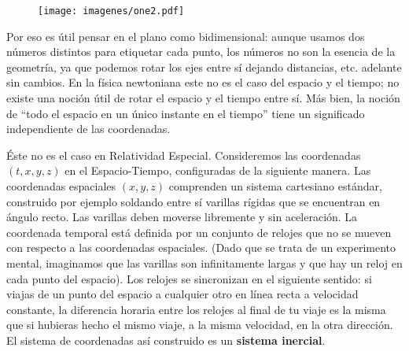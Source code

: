 \documentclass[11pt,b5paper,openany,twoside]{book}
\begin{document}
\begin{figure}[h]
\centering
\texttt{[image: imagenes/one2.pdf]}
\end{figure}

Por eso es útil pensar en el plano como bidimensional: aunque usamos dos números distintos para etiquetar cada punto, los números no son la esencia de la geometría, ya que podemos rotar los ejes entre sí dejando distancias, etc. adelante sin cambios.
En la física newtoniana este no es el caso del espacio y el tiempo; no existe una noción útil de rotar el espacio y el tiempo entre sí.
Más bien, la noción de ``todo el espacio en un único instante en el tiempo'' tiene un significado independiente de las coordenadas.

Éste no es el caso en Relatividad Especial.
Consideremos las coordenadas $(t,x,y,z)$ en el Espacio-Tiempo, configuradas de la siguiente manera.
Las coordenadas espaciales $(x,y,z)$ comprenden un sistema cartesiano estándar, construido por ejemplo soldando entre sí varillas rígidas que se encuentran en ángulo recto.
Las varillas deben moverse libremente y sin aceleración.
La coordenada temporal está definida por un conjunto de relojes que no se mueven con respecto a las coordenadas espaciales.
(Dado que se trata de un experimento mental, imaginamos que las varillas son infinitamente largas y que hay un reloj en cada punto del espacio).
Los relojes se sincronizan en el siguiente sentido: si viajas de un punto del espacio a cualquier otro en línea recta a velocidad constante, la diferencia horaria entre los relojes al final de tu viaje es la misma que si hubieras hecho el mismo viaje, a la misma velocidad, en la otra dirección.
El sistema de coordenadas así construido es un {\bf sistema inercial}.
\end{document}
